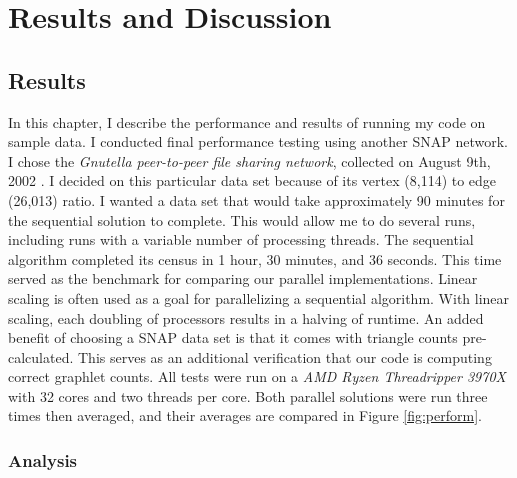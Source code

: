\documentclass[12pt,twoside]{reedthesis}
\begin{document}
	\chapter{Results and Discussion}
	
	
	
\section{Results}

In this chapter, I describe the performance and results of running my code on sample data. I conducted final performance testing using another SNAP network. I chose the \textit{Gnutella peer-to-peer file sharing network}, collected on August 9th, 2002 \cite{snap}. I decided on this particular data set because of its vertex (8,114) to edge (26,013) ratio. I wanted a data set that would take approximately 90 minutes for the sequential solution to complete. This would allow me to do several runs, including runs with a variable number of processing threads. The sequential algorithm completed its census in 1 hour, 30 minutes, and 36 seconds. This time served as the benchmark for comparing our parallel implementations. Linear scaling is often used as a goal for parallelizing a sequential algorithm. With linear scaling, each doubling of processors results in a halving of runtime. An added benefit of choosing a SNAP data set is that it comes with triangle counts pre-calculated. This serves as an additional verification that our code is computing correct graphlet counts. All tests were run on a \textit{AMD Ryzen Threadripper 3970X} with 32 cores and two threads per core. Both parallel solutions were run three times then averaged, and their averages are compared in Figure \ref{fig:perform}.

\subsection{Analysis}
\end{document}
